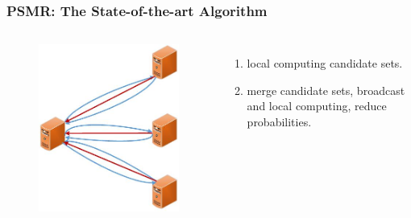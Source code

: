 \documentclass{beamer}
\begin{document}
\begin{frame}
\frametitle{PSMR: The State-of-the-art Algorithm}
\begin{columns}[c] %

\begin{figure}[htpb]
  \begin{center}
	\includegraphics[width=0.9\linewidth]{psmr.jpg}
  \end{center}
\end{figure}

\begin{enumerate}
\item local computing candidate sets.
\item merge candidate sets, broadcast and local computing, reduce probabilities.
\end{enumerate}

\end{columns}
\end{frame}

\end{document}
